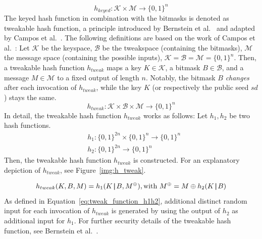\begin{equation}
\label{eq:keyed_hashfc_general}
h_{keyed}: \mathcal{K} \times \mathcal{M} \rightarrow \{0, 1 \}^n 
\end{equation}
The keyed hash function in combination with the bitmasks is denoted as tweakable hash function, a principle introduced by Bernstein et al.~\cite{tweakable_basispaper_sphincs_2019} and adapted by Campos et al.~\cite{fabio_paper_lms_vs_xmss}. The following definitions are based on the work of Campos et al.~\cite{fabio_paper_lms_vs_xmss}: 
Let $\mathcal{K}$ be the keyspace, $\mathcal{B}$ be the tweakspace (containing the bitmasks), $\mathcal{M}$ the message space (containing the possible inputs), $\mathcal{K}= \mathcal{B}=\mathcal{M}=\{0,1\}^n$.
Then, a tweakable hash function $h_{tweak}$ maps a key $K \in \mathcal{K}$, a bitmask $B \in \mathcal{B}$, and a message $M \in \mathcal{M}$ to a fixed output of length $n$. Notably, the bitmask $B$ \textit{changes} after each invocation of $h_{tweak}$, while the key $K$ (or respectively the public seed $sd$) stays the same.
\begin{equation}
h_{tweak}: \mathcal{K} \times \mathcal{B} \times \mathcal{M} \rightarrow \{0,1\}^n
\end{equation}
In detail, the tweakable hash function $h_{tweak}$ works as follows: Let $h_1, h_2$ be two hash functions. %
\begin{align}
& h_1 : \{0,1\}^{2n} \times \{0,1\}^n \rightarrow \{0,1\}^n \\
& h_2 : \{0,1\}^{2n} \rightarrow \{0,1\}^n 
\end{align}
Then, the tweakable hash function $h_{tweak}$ is constructed. For an explanatory depiction of $h_{tweak}$, see Figure~\ref{img:h_tweak}.

\begin{equation}
\label{eq:tweak_function_h1h2}
h_{tweak}(K,B,M) = h_1(K \operatorname{|\!\!|} B , M^{\oplus}), \text{with } M^{\oplus}=M \oplus h_2(K \operatorname{|\!\!|} B)
\end{equation}
As defined in Equation~\ref{eq:tweak_function_h1h2}, additional distinct random input for each invocation of $h_{tweak}$ is generated by using the output of $h_2$ as additional input for $h_1$. For further security details of the tweakable hash function, see Bernstein et al.~\cite{tweakable_basispaper_sphincs_2019}. 

